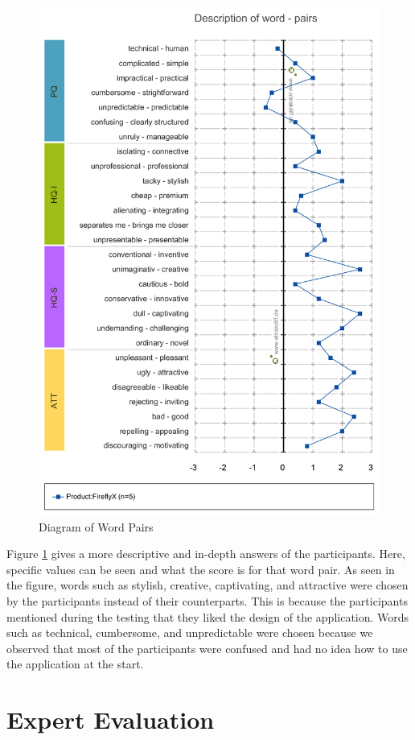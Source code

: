 \begin{figure}[H]
    \centering
    \includegraphics[width=12cm]{figures/NewFigures/Description_of_word-pairs.png}
    \caption{Diagram of Word Pairs}
    \label{fig:DiagramOfWordPairs}
\end{figure}

Figure \ref{fig:DiagramOfWordPairs} gives a more descriptive and in-depth answers of the participants. Here, specific values can be seen and what the score is for that word pair. As seen in the figure, words such as stylish, creative, captivating, and attractive were chosen by the participants instead of their counterparts. This is because the participants mentioned during the testing that they liked the design of the application. Words such as technical, cumbersome, and unpredictable were chosen because we observed that most of the participants were confused and had no idea how to use the application at the start.

\section{Expert Evaluation}
